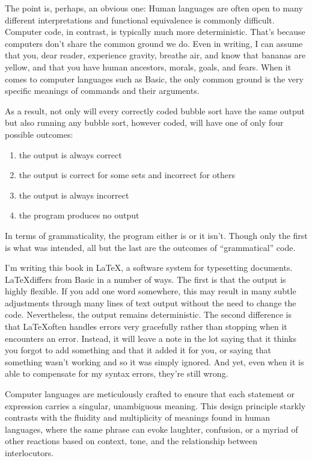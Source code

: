 The point is, perhaps, an obvious one: Human languages are often open to many different interpretations and functional equivalence is commonly difficult. Computer code, in contrast, is typically much more deterministic. That's because computers don't share the common ground we do. Even in writing, I can assume that you, dear reader, experience gravity, breathe air, and know that bananas are yellow, and that you have human ancestors, morals, goals, and fears. When it comes to computer languages such as Basic, the only common ground is the very specific meanings of commands and their arguments. 

As a result, not only will every correctly coded bubble sort have the same output but also running any bubble sort, however coded, will have one of only four possible outcomes:

\begin{enumerate}
    \item the output is always correct
    \item the output is correct for some sets and incorrect for others
    \item the output is always incorrect
    \item the program produces no output
\end{enumerate}

In terms of grammaticality, the program either is or it isn't. Though only the first is what was intended, all but the last are the outcomes of ``grammatical'' code.

I'm writing this book in \LaTeX, a software system for typesetting documents. \LaTeX differs from Basic in a number of ways. The first is that the output is highly flexible. If you add one word somewhere, this may result in many subtle adjustments through many lines of text output without the need to change the code. Nevertheless, the output remains deterministic. The second difference is that \LaTeX often handles errors very gracefully rather than stopping when it encounters an error. Instead, it will leave a note in the lot saying that it thinks you forgot to add something and that it added it for you, or saying that something wasn't working and so it was simply ignored. And yet, even when it is able to compensate for my syntax errors, they're still wrong.

Computer languages are meticulously crafted to ensure that each statement or expression carries a singular, unambiguous meaning. This design principle starkly contrasts with the fluidity and multiplicity of meanings found in human languages, where the same phrase can evoke laughter, confusion, or a myriad of other reactions based on context, tone, and the relationship between interlocutors.


